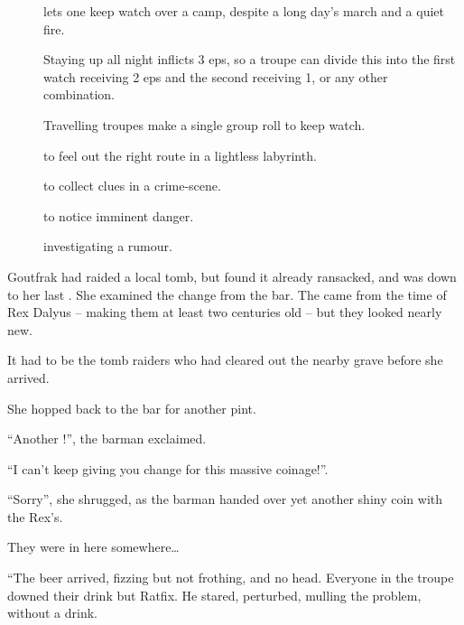 \begin{multicols}{2}
\begin{description}
  \item[]
    lets one keep watch over a camp, despite a long day's march and a quiet fire.

    Staying up all night inflicts 3 \glspl{ep}, so a troupe can divide this into the first watch receiving 2 \glspl{ep} and the second receiving 1, or any other combination.

    Travelling troupes make a single group roll to keep watch.

  \item[]
    to feel out the right route in a lightless labyrinth.
  \item[]
    to collect clues in a crime-scene.
  \item[]
    to notice imminent danger.
  \item[]
    investigating a rumour.
\end{description}

\ifodd\value{r4}
\begin{exampletext}
  Goutfrak had raided a local tomb, but found it already ransacked, and was down to her last .
  She examined the change from the bar.
  The  came from the time of Rex Dalyus -- making them at least two centuries old -- but they looked nearly new.

  It had to be the tomb raiders who had cleared out the nearby grave before she arrived.

  She hopped back to the bar for another pint.

  ``Another !'',
  the barman exclaimed.

  ``I can't keep giving you change for this massive coinage!''.

  ``Sorry'',
  she shrugged, as the barman handed over yet another shiny coin with the Rex's.

  They were in here somewhere\ldots

\end{exampletext}

\else

\begin{exampletext}
  ``The beer arrived, fizzing but not frothing, and no head.
  Everyone in the troupe downed their drink but Ratfix.
  He stared, perturbed, mulling the problem, without a drink.


\end{exampletext}
\end{multicols}

